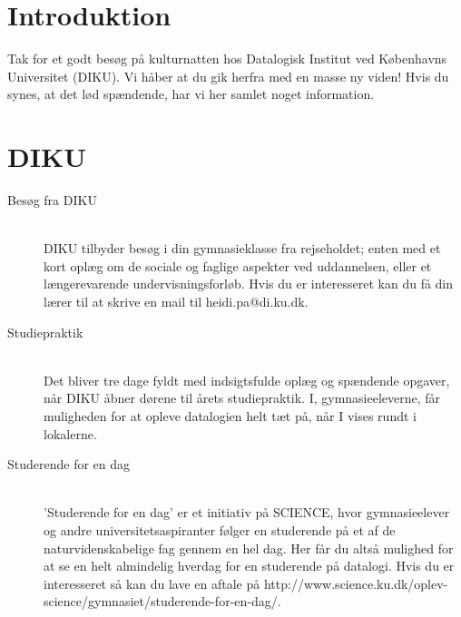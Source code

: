 \documentclass[11pt]{article}
\begin{document}
\section{Introduktion}
Tak for et godt besøg på kulturnatten hos Datalogisk Institut ved Københavns Universitet (DIKU). Vi håber at du gik herfra med en masse ny viden! Hvis du synes, at det lød spændende, har vi her samlet noget information.

\section{DIKU}
\begin{description}
    \item[Besøg fra DIKU]~\\
        DIKU tilbyder besøg i din gymnasieklasse fra rejseholdet; enten med et kort oplæg om de sociale og faglige aspekter ved uddannelsen, eller et længerevarende undervisningsforløb. Hvis du er interesseret kan du få din lærer til at skrive en mail til heidi.pa@di.ku.dk.
    \item[Studiepraktik]~\\
        Det bliver tre dage fyldt med indsigtsfulde oplæg og spændende opgaver, når DIKU åbner dørene til årets studiepraktik. I, gymnasieeleverne, får muligheden for at opleve datalogien helt tæt på, når I vises rundt i lokalerne.
    \item[Studerende for en dag]~\\
        ’Studerende for en dag’ er et initiativ på SCIENCE, hvor gymnasieelever og andre universitetsaspiranter følger en studerende på et af de naturvidenskabelige fag gennem en hel dag. Her får du altså mulighed for at se en helt almindelig hverdag for en studerende på datalogi. Hvis du er interesseret så kan du lave en aftale på http://www.science.ku.dk/oplev-science/gymnasiet/studerende-for-en-dag/.
\end{description}
\end{document}
